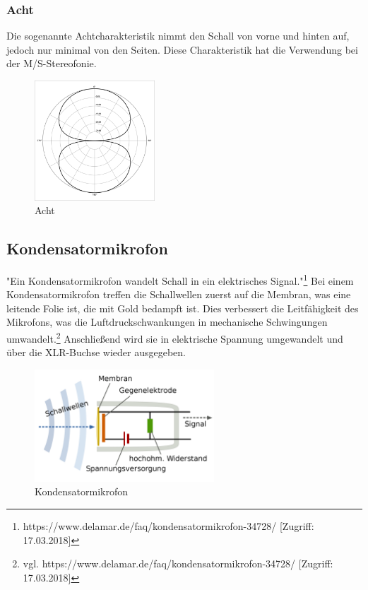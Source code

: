 \subsubsection{Acht}
Die sogenannte Achtcharakteristik nimmt den Schall von vorne und hinten auf, jedoch nur minimal von den Seiten. Diese Charakteristik hat die Verwendung bei der M/S-Stereofonie. 
\begin{figure}[H]
	\centering
	\includegraphics[width=0.4\textwidth]{abb7} 
	\caption{Acht}
\end{figure}
\subsection{Kondensatormikrofon}
"Ein Kondensatormikrofon wandelt Schall in ein elektrisches Signal."\footnote{\label{}https://www.delamar.de/faq/kondensatormikrofon-34728/ [Zugriff: 17.03.2018]} Bei einem Kondensatormikrofon treffen die Schallwellen zuerst auf die Membran, was eine leitende Folie ist, die mit Gold bedampft ist. Dies verbessert die  Leitfähigkeit des Mikrofons, was die Luftdruckschwankungen in mechanische Schwingungen umwandelt.\footnote{\label{}vgl. https://www.delamar.de/faq/kondensatormikrofon-34728/ [Zugriff: 17.03.2018]} Anschließend wird sie in elektrische Spannung umgewandelt und über die XLR-Buchse wieder ausgegeben. 
\begin{figure}[H]
	\centering
	\includegraphics[width=0.6\textwidth]{abb8} 
	\caption{Kondensatormikrofon}
\end{figure}
